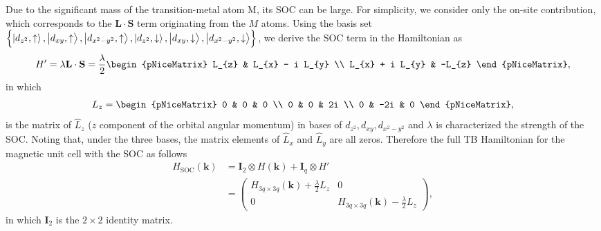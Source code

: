 \documentclass{report}
\newcommand{\f}[2]{\dfrac{#1}{#2}}
\begin{document}
Due to the significant mass of the transition-metal atom M, its \ac{SOC} can be large. For simplicity, we consider only the on-site contribution, which corresponds to the $\mathbf{L \cdot S}$ term originating from the $M$ atoms. Using the basis set $\left\{\ket{d_{z^{2}},\uparrow},\ket{d_{xy},\uparrow},\ket{d_{x^{2} - y^{2}},\uparrow},\ket{d_{z^{2}},\downarrow},\ket{d_{xy},\downarrow},\ket{d_{x^{2} - y^{2}},\downarrow}\right\}$, we derive the SOC term in the Hamiltonian as
\begin{gather}
	H{'}
	= \lambda \mathbf{L \cdot S}
	= \f{\lambda}{2}
	\begin{pNiceMatrix}
		L_{z}           & L_{x} - i L_{y} \\
		L_{x} + i L_{y} & -L_{z}
	\end{pNiceMatrix},
\end{gather}
in which
\begin{gather}
	L_{z}
	=
	\begin{pNiceMatrix}
		0 & 0   & 0  \\
		0 & 0   & 2i \\
		0 & -2i & 0
	\end{pNiceMatrix},
\end{gather}
is the matrix of $\hat{L}_{z}$ ($z$ component of the orbital angular momentum) in bases of $d_{z^{2}},d_{xy},d_{x^{2} - y^{2}}$ and $\lambda$ is characterized the strength of the \ac{SOC}. Noting that, under the three bases, the matrix elements of $\hat{L}_{x}$ and $\hat{L}_{y}$ are all zeros. Therefore the full \ac{TB} Hamiltonian for the magnetic unit cell with the SOC as follows
\begin{equation}
	\begin{aligned}
		H_{\text{SOC}}(\mathbf{k})
		 & = \mathbf{I}_{2} \otimes H(\mathbf{k}) + \mathbf{I}_{q} \otimes H{'} \\
		 & =
		\begin{pmatrix}
			H_{3q \times 3q}(\mathbf{k}) + \frac{\lambda}{2} L_{z} & 0                                                      \\
			0                                                      & H_{3q \times 3q}(\mathbf{k}) - \frac{\lambda}{2} L_{z}
		\end{pmatrix},
	\end{aligned}
\end{equation}
in which $\mathbf{I}_{2}$ is the $2\times 2$ identity matrix.
\end{document}
